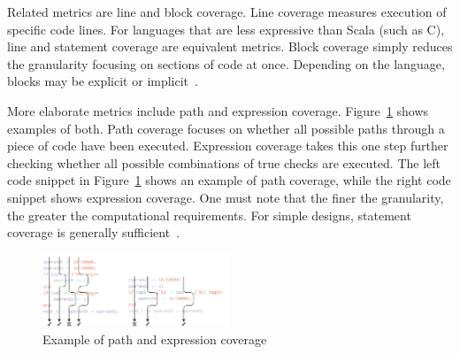 \documentclass[conference]{IEEEtran}
\begin{document}
Related metrics are line and block coverage. Line coverage measures execution of specific code lines. For languages that are less expressive than Scala (such as C), line and statement coverage are equivalent metrics. Block coverage simply reduces the granularity focusing on sections of code at once. Depending on the language, blocks may be explicit or implicit~\cite{hdlverify}. %


More elaborate metrics include path and expression coverage. Figure~\ref{fig:expr} shows examples of both. Path coverage focuses on whether all possible paths through a piece of code have been executed. 
Expression coverage takes this one step further checking whether all possible combinations of true checks are executed. The left code snippet in Figure~\ref{fig:expr} shows an example of path coverage, while the right code snippet shows expression coverage. One must note that the finer the granularity, the greater the computational requirements. For simple designs, statement coverage is generally sufficient~\cite{hdlverify}.

\begin{figure}
    \centering
    \includegraphics[width=0.5\textwidth]{Coverage_example.pdf}
    \caption{Example of path and expression coverage}
\label{fig:expr}
\end{figure}
\end{document}
